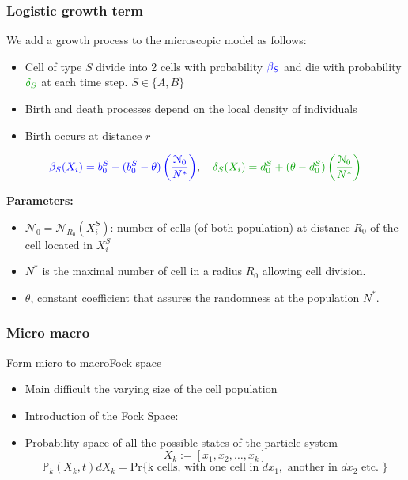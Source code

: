 \documentclass[10pt]{beamer}
\theoremstyle{remark}
\newcommand\Fontvii{\fontsize{9}{7.2}\selectfont}
\begin{document}
\begin{frame}
\frametitle{Logistic growth term}
We add a growth process to the microscopic model as follows:

\begin{itemize}
	\item  Cell of type $S$ divide into 2 cells with probability $\textcolor{blue}{\beta_S}$ and die with probability $\textcolor{remivert}{\delta_S}$ at each time step. $S \in \{ A,B\}$
	\item  Birth and death processes depend on the local density of individuals
	\item Birth occurs at distance $r$ 
	\end{itemize}
\begin{equation}
\textcolor{blue}{\beta_{S}(X_i) = b_0^{S} -(b_0^{S} - \theta)\left(\frac{\mathcal{N}_{0}}{N^{*}}\right)},
\quad
\textcolor{remivert}{\delta_{S}(X_i) = d_0^{S} + (\theta - d_0^{S}) \left(\frac{\mathcal{N}_{0}}{N^{*}}\right)}
\end{equation}


\textbf{Parameters:}
\begin{itemize}
\item $\mathcal{N}_{0}=\mathcal{N}_{R_0}(X_i^S)$: number of cells (of both population) at distance $R_0$ of the cell located in $X_i^S$ 
\item $N^*$ is the maximal number of cell in a radius $R_0$ allowing cell division. 
\item $\theta$, constant coefficient that assures the randomness at the population $N^{*}$.

\end{itemize}


\end{frame}



\begin{frame}
\frametitle{Micro macro}

\end{frame}

\begin{frame}{Form micro to macro}{Fock space}
\begin{itemize}
	\item Main difficult the varying size of the cell population
	\item  Introduction of the Fock Space: 
	\item Probability space of all the possible states of the particle system
	$$ X_k := \left[ x_1, x_2, \ldots, x_k \right] $$
	$$ \mathbb{P}_k(X_k,t)dX_k = \text{Pr\{k cells, with one cell in }dx_1,\text{ another in } dx_2\text{ etc. \}} $$
\end{itemize}
\end{frame}
\end{document}
